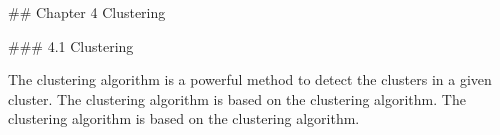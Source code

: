 

## Chapter 4 Clustering

### 4.1 Clustering

The clustering algorithm is a powerful method to detect the clusters in a given cluster. The clustering algorithm is based on the clustering algorithm. The clustering algorithm is based on the clustering algorithm.


